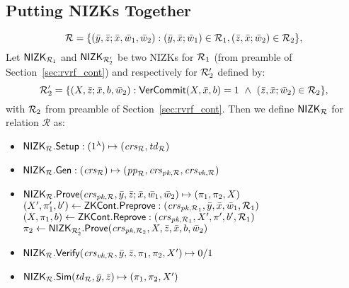 \subsection{Putting NIZKs Together}
$$\rel = \{(\bary, \barz; \barx, \baromega_1, \baromega_2):  (\bary, \barx; \baromega_1) \in \relone, (\barz, \barx; \baromega_2) \in \reltwo \},$$
Let $\nizkone$ and $\nizktwo$ be two NIZKs for $\relone$ (from preamble of Section~\ref{sec:rvrf_cont}) and respectively for $\reltwo'$ defined by:
$$\reltwo' = \{(X, \barz; \barx, b, \baromega_2): \VerifyCom(X, \barx, b) =1 \ \wedge \ (\barz, \barx; \baromega_2) \in \reltwo \},$$
\noindent with $\reltwo$ from preamble of Section~\ref{sec:rvrf_cont}. Then we define $\nizkR$ for relation $\mathcal{R}$ as:
\begin{itemize}
\item $\nizkR.\Setup: (1^{\lambda}) \mapsto (\crsR, \twR)$
\item $\nizkR.\Gen: (\crsR) \mapsto (\ppR, \crspkR, \crsvkR)$
\item $\nizkR.\Prove(\crspkR,\bary, \barz; \barx, \baromega_1, \baromega_2 ) \mapsto (\pi_1, \pi_2, X)$ \\
$(X', \pi'_1, b')\leftarrow \ZKCont.\Preprove:(\crspkone, \bar{y}, \bar{x}, \baromega_1, \relone)$ \\
$(X, \pi_1, b) \leftarrow \ZKCont.\Reprove: (\crspkone, X', \pi', b', \relone)$ \\
$ \pi_2 \leftarrow \nizktwo.\Prove(\crspktwo, X, \barz, \barx, b, \baromega_2)$ 
\item $\nizkR.\Verify(\crsvkR,\bary, \barz, \pi_1, \pi_2, X') \mapsto 0/1$
\item $\nizkR.\Sim(\twR, \bary, \barz) \mapsto (\pi_1, \pi_2, X')$
\end{itemize}


